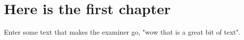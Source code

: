 \chapter{Here is the first chapter}

Enter some text that makes the examiner go, "wow that is a great bit of text". 

